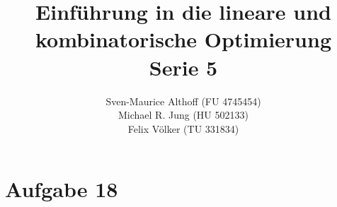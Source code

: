 \documentclass[a4paper,10pt,german]{scrartcl}
\title{Einführung in die lineare und kombinatorische Optimierung\\
Serie 5}
\author{Sven-Maurice Althoff (FU 4745454)\\Michael R. Jung (HU 502133)\\Felix Völker (TU 331834)}
\begin{document}
\maketitle

\section{Aufgabe 18}
\end{document}
